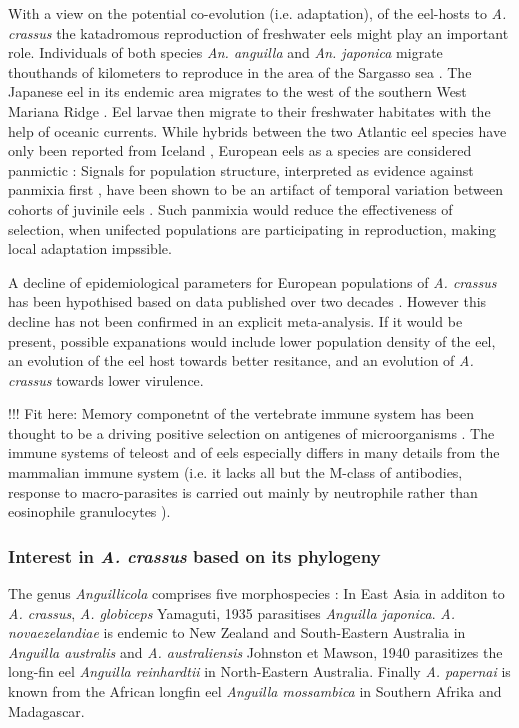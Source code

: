 With a view on the potential co-evolution (i.e. adaptation), of the
eel-hosts to \textit{A. crassus} the katadromous reproduction of
freshwater eels might play an important role. Individuals of both
species \textit{An. anguilla} and \textit{An. japonica} migrate
thouthands of kilometers to reproduce in the area of the Sargasso sea
\cite{pmid19779192}. The Japanese eel in its endemic area migrates to
the west of the southern West Mariana Ridge \cite{pmid20735676}. Eel
larvae then migrate to their freshwater habitates with the help of
oceanic currents. While hybrids between the two Atlantic eel species
have only been reported from Iceland \cite{pmid21299662}, European
eels as a species are considered panmictic \cite{pmid20735687}:
Signals for population structure, interpreted as evidence against
panmixia first \cite{pmid11234011}, have been shown to be an artifact
of temporal variation between cohorts of juvinile eels
\cite{pmid19417764, pmid21299662, pmid16024374}. Such panmixia would
reduce the effectiveness of selection, when unifected populations are
participating in reproduction, making local adaptation impssible.

A decline of epidemiological parameters for European populations of
\textit{A. crassus} has been hypothised based on data published over
two decades \cite{lefebvre_anguillicolosis:_2004}. However this
decline has not been confirmed in an explicit meta-analysis. If it
would be present, possible expanations would include lower population
density of the eel, an evolution of the eel host towards better
resitance, and an evolution of \textit{A. crassus} towards lower
virulence.


!!! Fit here: Memory componetnt of the vertebrate immune system has
been thought to be a driving positive selection on antigenes of
microorganisms \cite{conway_measuring_2002}. The immune systems of
teleost and of eels especially differs in many details from the
mammalian immune system (i.e. it lacks all but the M-class of
antibodies, response to macro-parasites is carried out mainly by
neutrophile rather than eosinophile granulocytes
\cite{nielsen_eel_2006}).

\subsubsection{Interest in \textit{A. crassus} based on its
    phylogeny}
\label{phyl-int}

The genus \textit{Anguillicola} comprises five morphospecies
\cite{taraschewski_revision_1988}: In East Asia in additon to
\textit{A. crassus}, \textit{A. globiceps} Yamaguti, 1935
\cite{yamaguti_globiceps} parasitises \textit{Anguilla
  japonica}. \textit{A. novaezelandiae} is endemic to New Zealand and
South-Eastern Australia in \textit{Anguilla australis} and
\textit{A. australiensis} Johnston et Mawson, 1940
\cite{johnston1940some} parasitizes the long-fin eel \textit{Anguilla
  reinhardtii} in North-Eastern Australia. Finally
\textit{A. papernai} is known from the African longfin eel
\textit{Anguilla mossambica} in Southern Afrika and Madagascar.

